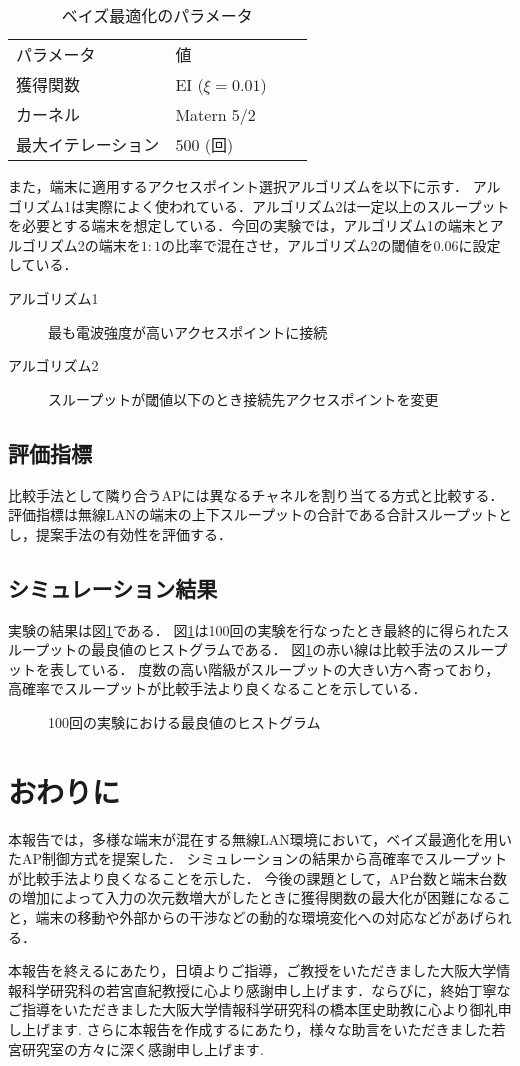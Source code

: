 \documentclass[a4paper,11pt]{jarticle}
\begin{document}
\begin{table}[H]
\centering
\caption{ベイズ最適化のパラメータ}
\begin{tabular}{l|lll}
パラメータ & 値 &  &  \\ \cline{1-2}
獲得関数 & EI ($\xi=0.01$)&  &  \\
カーネル & Matern 5/2 &  &  \\
最大イテレーション & 500 (回) &  & \\
\end{tabular}
\label{bayes_parameter}
\end{table}

また，端末に適用するアクセスポイント選択アルゴリズムを以下に示す．
アルゴリズム1は実際によく使われている．アルゴリズム2は一定以上のスループットを必要とする端末を想定している．今回の実験では，アルゴリズム1の端末とアルゴリズム2の端末を$1:1$の比率で混在させ，アルゴリズム2の閾値を0.06に設定している．

\begin{description}
  \item[アルゴリズム1]最も電波強度が高いアクセスポイントに接続
  \item[アルゴリズム2]スループットが閾値以下のとき接続先アクセスポイントを変更
\end{description}

\subsection{評価指標}
比較手法として隣り合うAPには異なるチャネルを割り当てる方式と比較する．
評価指標は無線LANの端末の上下スループットの合計である合計スループットとし，提案手法の有効性を評価する．


\subsection{シミュレーション結果}
実験の結果は図\ref{histogram}である．
図\ref{histogram}は100回の実験を行なったとき最終的に得られたスループットの最良値のヒストグラムである．
図\ref{histogram}の赤い線は比較手法のスループットを表している．
度数の高い階級がスループットの大きい方へ寄っており，高確率でスループットが比較手法より良くなることを示している．

\begin{figure}[t]
  \centering
  
  \caption{100回の実験における最良値のヒストグラム}
  \label{histogram}
\end{figure}

\section{おわりに}
本報告では，多様な端末が混在する無線LAN環境において，ベイズ最適化を用いたAP制御方式を提案した．
シミュレーションの結果から高確率でスループットが比較手法より良くなることを示した．
今後の課題として，AP台数と端末台数の増加によって入力の次元数増大がしたときに獲得関数の最大化が困難になること，端末の移動や外部からの干渉などの動的な環境変化への対応などがあげられる．

\acknowledgement
本報告を終えるにあたり，日頃よりご指導，ご教授をいただきました大阪大学情報科学研究科の若宮直紀教授に心より感謝申し上げます．ならびに，終始丁寧なご指導をいただきました大阪大学情報科学研究科の橋本匡史助教に心より御礼申し上げます. さらに本報告を作成するにあたり，様々な助言をいただきました若宮研究室の方々に深く感謝申し上げます.



\end{document}
